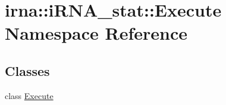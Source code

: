 \hypertarget{namespaceirna_1_1iRNA__stat_1_1Execute}{
\section{irna\-:\-:i\-R\-N\-A\-\_\-stat\-:\-:\-Execute \-Namespace \-Reference}
\label{namespaceirna_1_1iRNA__stat_1_1Execute}
}
\subsection*{\-Classes}
\begin{DoxyCompactItemize}
\item 
class \hyperlink{classirna_1_1iRNA__stat_1_1Execute_1_1Execute}{\-Execute}
\end{DoxyCompactItemize}
